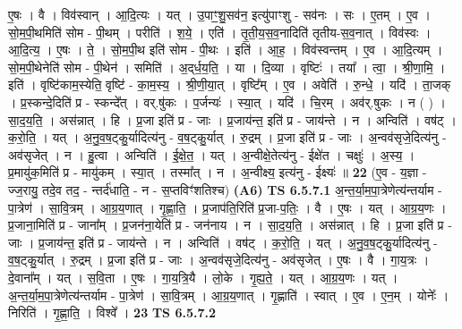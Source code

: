 \documentclass[17pt]{extarticle}
\begin{document}
                  ए॒षः । वै । विव॑स्वान् । आ॒दि॒त्यः । यत् । उ॒पाꣳ॒॒शु॒सव॑न॒ इत्यु॑पाꣳशु - सव॑नः । सः । ए॒तम् । ए॒व । सो॒म॒पी॒थमिति॑ सोम - पी॒थम् । परीति॑ । श॒ये॒ । एति॑ । तृ॒ती॒य॒स॒व॒नादिति॑ तृतीय-स॒व॒नात् । विव॑स्वः । आ॒दि॒त्य॒ । ए॒षः । ते॒ । सो॒म॒पी॒थ इति॑ सोम - पी॒थः । इति॑ । आ॒ह॒ । विव॑स्वन्तम् । ए॒व । आ॒दि॒त्यम् । सो॒म॒पी॒थेनेति॑ सोम - पी॒थेन॑ । समिति॑ । अ॒द्‌र्ध॒य॒ति॒ । या । दि॒व्या । वृष्टिः॑ । तया᳚ । त्वा॒ । श्री॒णा॒मि॒ । इति॑ । वृष्टि॑काम॒स्येति॒ वृष्टि॑ - का॒म॒स्य॒ । श्री॒णी॒या॒त् । वृष्टि᳚म् । ए॒व । अवेति॑ । रु॒न्धे॒ । यदि॑ । ता॒जक् । प्र॒स्कन्दे॒दिति॑ प्र - स्कन्दे᳚त् । वर्.षु॑कः । प॒र्जन्यः॑ । स्या॒त् । यदि॑ । चि॒रम् । अव॑र्.षुकः । न ( ) । सा॒द॒य॒ति॒ । अस॑न्नात् । हि । प्र॒जा इति॑ प्र - जाः । प्र॒जाय॑न्त॒ इति॑ प्र - जाय॑न्ते । न । अन्विति॑ । वष॑ट् । क॒रो॒ति॒ । यत् । अ॒नु॒व॒ष॒ट्कु॒र्यादित्य॑नु - व॒ष॒ट्कु॒र्यात् । रु॒द्रम् । प्र॒जा इति॑ प्र - जाः । अ॒न्वव॑सृजे॒दित्य॑नु - अव॑सृजेत् । न । हु॒त्वा । अन्विति॑ । ई॒क्षे॒त॒ । यत् । अ॒न्वीक्षे॒तेत्य॑नु - ईक्षे॑त । चक्षुः॑ । अ॒स्य॒ । प्र॒मायु॑क॒मिति॑ प्र - मायु॑कम् । स्या॒त् । तस्मा᳚त् । न । अ॒न्वीक्ष्य॒ इत्य॑नु - ईक्ष्यः॑ ॥ \textbf{  22} \newline
                  \newline
                      (ए॒व - य॒ज्ञा - ज्ज॒रायु॒ तदे॒व तद॒ - न्तर्द॑धाति॒ - न - स॒प्तविꣳ॑शतिश्च)  \textbf{(A6)} \newline \newline
                                \textbf{ TS 6.5.7.1} \newline
                  अ॒न्त॒र्या॒म॒पा॒त्रेणेत्य॑न्तर्याम - पा॒त्रेण॑ । सा॒वि॒त्रम् । आ॒ग्र॒य॒णात् । गृ॒ह्णा॒ति॒ । प्र॒जाप॑ति॒रिति॑ प्र॒जा-प॒तिः॒ । वै । ए॒षः । यत् । आ॒ग्र॒य॒णः । प्र॒जाना॒मिति॑ प्र - जाना᳚म् । प्र॒जन॑ना॒येति॑ प्र - जन॑नाय । न । सा॒द॒य॒ति॒ । अस॑न्नात् । हि । प्र॒जा इति॑ प्र - जाः । प्र॒जाय॑न्त॒ इति॑ प्र - जाय॑न्ते । न । अन्विति॑ । वष॑ट् । क॒रो॒ति॒ । यत् । अ॒नु॒व॒ष॒ट्कु॒र्यादित्य॑नु - व॒ष॒ट्कु॒र्यात् । रु॒द्रम् । प्र॒जा इति॑ प्र - जाः । अ॒न्वव॑सृजे॒दित्य॑नु - अव॑सृजेत् । ए॒षः । वै । गा॒य॒त्रः । दे॒वाना᳚म् । यत् । स॒वि॒ता । ए॒षः । गा॒य॒त्रि॒यै । लो॒के । गृ॒ह्य॒ते॒ । यत् । आ॒ग्र॒य॒णः । यत् । अ॒न्त॒र्या॒म॒पा॒त्रेणेत्य॑न्तर्याम - पा॒त्रेण॑ । सा॒वि॒त्रम् । आ॒ग्र॒य॒णात् । गृ॒ह्णाति॑ । स्वात् । ए॒व । ए॒न॒म् । योनेः᳚ । निरिति॑ । गृ॒ह्णा॒ति॒ । विश्वे᳚ । \textbf{  23} \newline
                  \newline
                                \textbf{ TS 6.5.7.2} \newline
\end{document}
